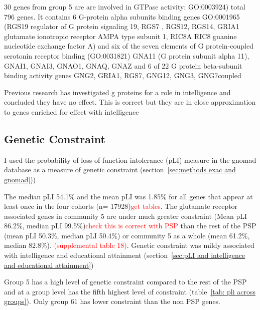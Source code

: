 30 genes from group 5 are are involved in GTPase activity: GO:0003924) total 796 genes. It contains 6 G-protein alpha subunits binding genes GO:0001965 (RGS19 regulator of G protein signaling 19, RGS7 , RGS12, RGS14, GRIA1 glutamate ionotropic receptor AMPA type subunit 1,  RIC8A RIC8 guanine nucleotide exchange factor A) and six of the seven elements of G protein-coupled serotonin receptor binding (GO:0031821) GNA11 (G protein subunit alpha 11), GNAI1, GNAI3, GNAO1, GNAQ, GNAZ and 6 of 22 G protein beta-subunit binding activity genes GNG2, GRIA1, RGS7, GNG12, GNG3, GNG7coupled

Previous research has investigated g proteins for a role in intelligence and concluded they have no effect\cite{hill2014functional}. This is correct but they are in close approximation to genes enriched for effect with intelligence
 
\subsection{Genetic Constraint}
I used the probability of loss of function intolerance (pLI) measure in the gnomad database as a measure of genetic constraint\cite{lek2016analysis} (section~\ref{sec:methods exac and gnomad})) 

The median pLI 54.1\% and the mean pLI was 1.85\% for all genes that appear at least once in the four cohorts (n= 17928)\textcolor{red}{get tables}. The glutamate receptor associated genes in community 5 are under much greater constraint (Mean pLI 86.2\%, median pLI 99.5\%)\textcolor{red}{check this is correct with PSP} than the rest of the PSP (mean pLI 50.3\%, median pLI 50.4\%) or community 5 as a whole (mean 61.2\%, median 82.8\%).
\textcolor{red}{(supplemental table 18)}. Genetic constraint was mildy associated with intelligence and educational attainment (section~\ref{sec:pLI and intelligence and educational attainment})


Group 5 has a high level of genetic constraint compared to the rest of the PSP and at a group level has the fifth highest level of constraint (table~\ref{tab: pli across groups}). Only group 61 has lower constraint than the non PSP genes. 







